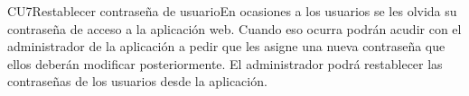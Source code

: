 \begin{UseCase}{CU7}{Restablecer contraseña de usuario}{En ocasiones a los usuarios se les olvida su contraseña de acceso a la aplicación web. Cuando eso ocurra podrán acudir con el administrador de la aplicación a pedir que les asigne una nueva contraseña que ellos deberán modificar posteriormente. El administrador podrá restablecer las contraseñas de los usuarios desde la aplicación.}
	\end{UseCase}
			

